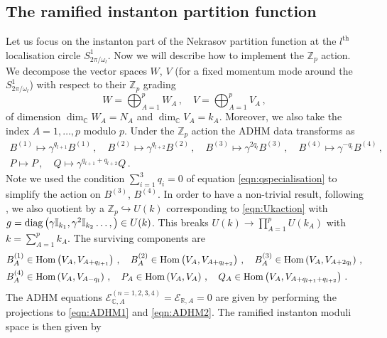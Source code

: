 \documentclass[main.tex]{subfiles}
\begin{document}
\subsection{The ramified instanton partition function}
Let us focus on the instanton part of the Nekrasov partition function at the $l^{\text{th}}$ localisation circle $S^1_{2\pi/\omega_l}$.
Now we will describe how to implement the $\mathbb{Z}_p$ action. We decompose the vector spaces $W$, $V$ (for a fixed momentum mode around the $S^1_{2\pi/\omega_l}$) with respect to their $\mathbb{Z}_p$ grading
\begin{equation}
W=\bigoplus_{A=1}^pW_A\,,\quad V=\bigoplus_{A=1}^pV_A\,,
\end{equation}
of dimension $\dim_{\mathbb{C}}W_A=N_A$ and $\dim_{\mathbb{C}}V_A=k_A$. Moreover, we also take the index $A=1,\dots,p$ modulo $p$.
Under the $\mathbb{Z}_p$ action the ADHM data transforms as
\begin{gather}
B^{(1)}\mapsto\gamma^{q_{l+1}}B^{(1)}\,,\quad B^{(2)}\mapsto\gamma^{q_{l+2}}B^{(2)}\,,\quad B^{(3)}\mapsto\gamma^{2q_l}B^{(3)}\,,\quad B^{(4)}\mapsto\gamma^{-q_l}B^{(4)}\,,\\
P\mapsto P\,,\quad Q\mapsto\gamma^{q_{l+1}+q_{l+2}}Q\,.
\end{gather}
Note we used the condition $\sum_{i=1}^3q_i=0$ of equation \eqref{eqn:qspecialisation} to simplify the action on $B^{(3)}$, $B^{(4)}$. In order to have a non-trivial result, following \cite{Douglas:1996sw}, we also quotient by a $\mathbb{Z}_p\hookrightarrow U(k)$ corresponding to \eqref{eqn:Ukaction} with $g=\operatorname{diag}\left(\gamma\mathbb{I}_{k_1},\gamma^2\mathbb{I}_{k_2}\dots,\right)\in U(k)$. This breaks $U(k)\to\prod_{A=1}^pU(k_A)$ with $k=\sum_{A=1}^pk_A$. The surviving components are 
\begin{equation}
\begin{aligned}
&B^{(1)}_{A}\in\operatorname{Hom}\left(V_A,V_{A+q_{l+1}}\right)\,,\quad B^{(2)}_{A}\in\operatorname{Hom}\left(V_A,V_{A+q_{l+2}}\right)\,,\quad B^{(3)}_{A}\in\operatorname{Hom}\left(V_A,V_{A+2q_{l}}\right)\,,\\
&B^{(4)}_{A}\in\operatorname{Hom}\left(V_A,V_{A-q_{l}}\right)\,,\quad P_{A}\in\operatorname{Hom}\left(V_A,V_{A}\right)\,,\quad Q_{A}\in\operatorname{Hom}\left(V_A,V_{A+q_{l+1}+q_{l+2}}\right)\,.
\end{aligned}
\end{equation}
The ADHM equations $\mathcal{E}^{(n=1,2,3,4)}_{\mathbb{C},A}=\mathcal{E}_{\mathbb{R},A}=0$ are given by performing the projections to \eqref{eqn:ADHM1} and \eqref{eqn:ADHM2}. The ramified instanton moduli space is then given by 
\end{document}

